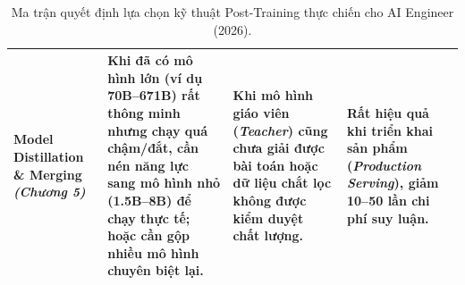 \documentclass[11pt,a4paper,oneside]{report}
\theoremstyle{definition}
\begin{document}
\begin{table}[h!]
\begin{tabularx}{\textwidth}{>{\bfseries}p{2.7cm} p{3.6cm} X p{3.4cm}}
\midrule
Model Distillation \& Merging \newline \textit{(Chương 5)} \newline \citep{gu2024minillm, yadav2023ties} & Khi đã có mô hình lớn (ví dụ 70B--671B) rất thông minh nhưng chạy quá chậm/đắt, cần \textbf{nén năng lực sang mô hình nhỏ (1.5B--8B)} để chạy thực tế; hoặc cần gộp nhiều mô hình chuyên biệt lại. & Khi mô hình giáo viên (\textit{Teacher}) cũng chưa giải được bài toán hoặc dữ liệu chắt lọc không được kiểm duyệt chất lượng. & Rất hiệu quả khi triển khai sản phẩm (\textit{Production Serving}), giảm 10--50 lần chi phí suy luận. \\
\bottomrule
\end{tabularx}
\caption{Ma trận quyết định lựa chọn kỹ thuật Post-Training thực chiến cho AI Engineer (2026).}
\end{table}










\end{document}
